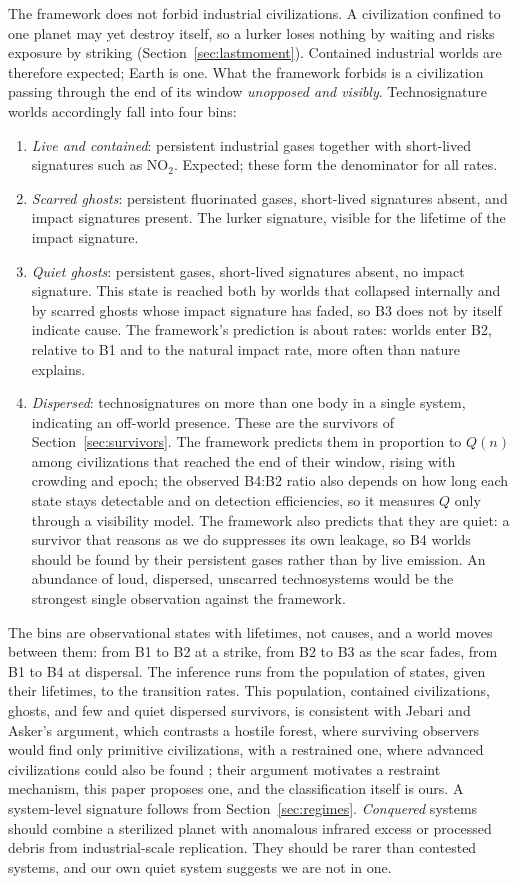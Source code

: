 \documentclass[preprint,12pt]{elsarticle}
\theoremstyle{definition}
\begin{document}
The framework does not forbid industrial civilizations. A civilization confined to one planet may yet destroy itself, so a lurker loses nothing by waiting and risks exposure by striking (Section~\ref{sec:lastmoment}). Contained industrial worlds are therefore expected; Earth is one. What the framework forbids is a civilization passing through the end of its window \emph{unopposed and visibly}. Technosignature worlds accordingly fall into four bins:
\begin{enumerate}
  \item[(B1)] \emph{Live and contained}: persistent industrial gases together with short-lived signatures such as NO$_2$. Expected; these form the denominator for all rates.
  \item[(B2)] \emph{Scarred ghosts}: persistent fluorinated gases, short-lived signatures absent, and impact signatures present. The lurker signature, visible for the lifetime of the impact signature.
  \item[(B3)] \emph{Quiet ghosts}: persistent gases, short-lived signatures absent, no impact signature. This state is reached both by worlds that collapsed internally and by scarred ghosts whose impact signature has faded, so B3 does not by itself indicate cause. The framework's prediction is about rates: worlds enter B2, relative to B1 and to the natural impact rate, more often than nature explains.
  \item[(B4)] \emph{Dispersed}: technosignatures on more than one body in a single system, indicating an off-world presence. These are the survivors of Section~\ref{sec:survivors}. The framework predicts them in proportion to $Q(n)$ among civilizations that reached the end of their window, rising with crowding and epoch; the observed B4:B2 ratio also depends on how long each state stays detectable and on detection efficiencies, so it measures $Q$ only through a visibility model. The framework also predicts that they are quiet: a survivor that reasons as we do suppresses its own leakage, so B4 worlds should be found by their persistent gases rather than by live emission. An abundance of loud, dispersed, unscarred technosystems would be the strongest single observation against the framework.
\end{enumerate}
The bins are observational states with lifetimes, not causes, and a world moves between them: from B1 to B2 at a strike, from B2 to B3 as the scar fades, from B1 to B4 at dispersal. The inference runs from the population of states, given their lifetimes, to the transition rates. This population, contained civilizations, ghosts, and few and quiet dispersed survivors, is consistent with Jebari and Asker's argument, which contrasts a hostile forest, where surviving observers would find only primitive civilizations, with a restrained one, where advanced civilizations could also be found \citep{JebariAsker2024}; their argument motivates a restraint mechanism, this paper proposes one, and the classification itself is ours. A system-level signature follows from Section~\ref{sec:regimes}. \emph{Conquered} systems should combine a sterilized planet with anomalous infrared excess or processed debris from industrial-scale replication. They should be rarer than contested systems, and our own quiet system suggests we are not in one.
\end{document}
